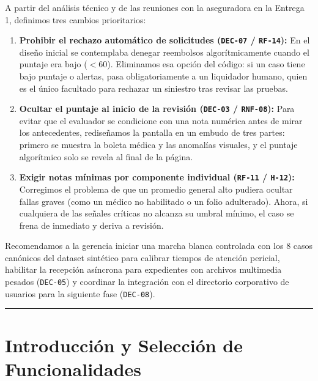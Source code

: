 \documentclass[11pt,letterpaper]{article}
\begin{document}
A partir del análisis técnico y de las reuniones con la aseguradora en la Entrega 1, definimos tres cambios prioritarios:
\begin{enumerate}
    \item \textbf{Prohibir el rechazo automático de solicitudes (\texttt{DEC-07} / \texttt{RF-14}):} En el diseño inicial se contemplaba denegar reembolsos algorítmicamente cuando el puntaje era bajo ($<60$). Eliminamos esa opción del código: si un caso tiene bajo puntaje o alertas, pasa obligatoriamente a un liquidador humano, quien es el único facultado para rechazar un siniestro tras revisar las pruebas.
    \item \textbf{Ocultar el puntaje al inicio de la revisión (\texttt{DEC-03} / \texttt{RNF-08}):} Para evitar que el evaluador se condicione con una nota numérica antes de mirar los antecedentes, rediseñamos la pantalla en un embudo de tres partes: primero se muestra la boleta médica y las anomalías visuales, y el puntaje algorítmico solo se revela al final de la página.
    \item \textbf{Exigir notas mínimas por componente individual (\texttt{RF-11} / \texttt{H-12}):} Corregimos el problema de que un promedio general alto pudiera ocultar fallas graves (como un médico no habilitado o un folio adulterado). Ahora, si cualquiera de las señales críticas no alcanza su umbral mínimo, el caso se frena de inmediato y deriva a revisión.
\end{enumerate}

Recomendamos a la gerencia iniciar una marcha blanca controlada con los 8 casos canónicos del dataset sintético para calibrar tiempos de atención pericial, habilitar la recepción asíncrona para expedientes con archivos multimedia pesados (\texttt{DEC-05}) y coordinar la integración con el directorio corporativo de usuarios para la siguiente fase (\texttt{DEC-08}).

\vspace{0.8em}
\noindent\rule{\textwidth}{0.4pt}

\newpage

\section{Introducción y Selección de Funcionalidades}
\end{document}
